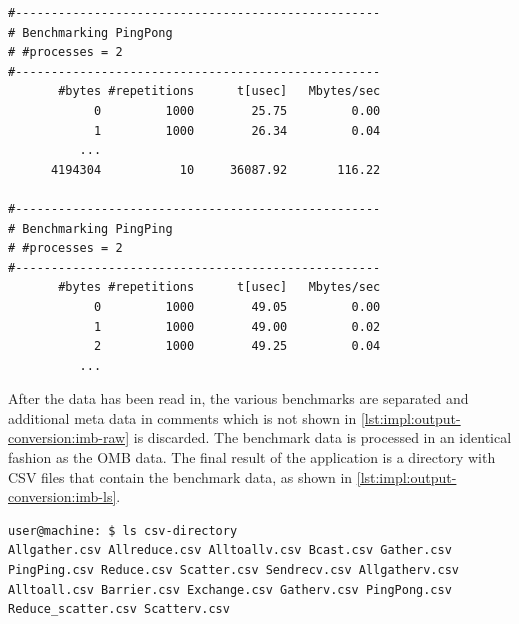 \begin{lstlisting}[style=console,captionpos={b},caption={Excerpt of the generated raw output of a \acs{IMB} run.},label=lst:impl:output-conversion:imb-raw]
#---------------------------------------------------
# Benchmarking PingPong
# #processes = 2
#---------------------------------------------------
       #bytes #repetitions      t[usec]   Mbytes/sec
            0         1000        25.75         0.00
            1         1000        26.34         0.04
          ...
      4194304           10     36087.92       116.22

#---------------------------------------------------
# Benchmarking PingPing
# #processes = 2
#---------------------------------------------------
       #bytes #repetitions      t[usec]   Mbytes/sec
            0         1000        49.05         0.00
            1         1000        49.00         0.02
            2         1000        49.25         0.04
          ...
\end{lstlisting}

After the data has been read in, the various benchmarks are separated and additional meta data in comments which is not shown in \autoref{lst:impl:output-conversion:imb-raw} is discarded. The benchmark data is processed in an identical fashion as the \ac{OMB} data. The final result of the application is a directory with \acs{CSV} files that contain the benchmark data, as shown in \autoref{lst:impl:output-conversion:imb-ls}.

\begin{lstlisting}[style=console,captionpos={b},caption={Listing of the result directory after processing an \ac{IMB} output file.},label=lst:impl:output-conversion:imb-ls]
user@machine: $ ls csv-directory
Allgather.csv Allreduce.csv Alltoallv.csv Bcast.csv Gather.csv PingPing.csv Reduce.csv Scatter.csv Sendrecv.csv Allgatherv.csv Alltoall.csv Barrier.csv Exchange.csv Gatherv.csv PingPong.csv Reduce_scatter.csv Scatterv.csv
\end{lstlisting}
